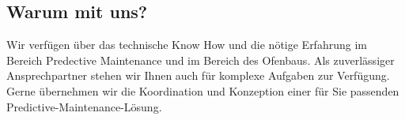 \subsection{Warum mit uns?}
Wir verfügen über das technische Know How und die nötige Erfahrung im Bereich Predective Maintenance und im Bereich des Ofenbaus. Als zuverlässiger Ansprechpartner stehen wir Ihnen auch für komplexe Aufgaben zur Verfügung. Gerne übernehmen wir die Koordination und Konzeption einer für Sie passenden Predictive-Maintenance-Lösung.
	